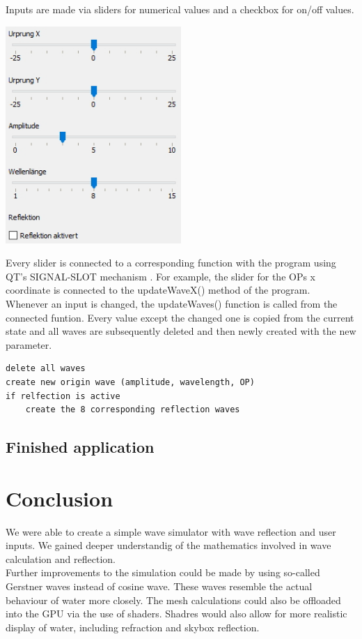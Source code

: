 \documentclass[12pt,a4paper]{scrartcl}
\begin{document}
Inputs are made via sliders for numerical values and a checkbox for on/off values.
\begin{center}
	\includegraphics[width=0.5\textwidth]{Images/Inputs.jpg}
\end{center}

Every slider is connected to a corresponding function with the program using QT's SIGNAL-SLOT mechanism \parencite[compare to][]{slidersExample}. For example, the slider for the OPs x coordinate is connected to the updateWaveX() method of the program.\\
Whenever an input is changed, the updateWaves() function is called from the connected funtion. Every value except the changed one is copied from the current state and all waves are subsequently deleted and then newly created with the new parameter.

\begin{lstlisting}[language=PSEUDO]
delete all waves
create new origin wave (amplitude, wavelength, OP)
if relfection is active
	create the 8 corresponding reflection waves
\end{lstlisting}

\subsection{Finished application}

\section{Conclusion}
We were able to create a simple wave simulator with wave reflection and user inputs. We gained deeper understandig of the mathematics involved in wave calculation and reflection.\\
Further improvements to the simulation could be made by using so-called Gerstner waves instead of cosine wave. These waves resemble the actual behaviour of water more closely. The mesh calculations could also be offloaded into the GPU via the use of shaders. Shadres would also allow for more realistic display of water, including refraction and skybox reflection.\\
\end{document}
